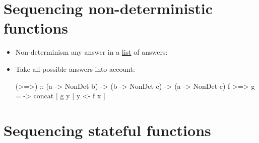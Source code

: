 

\section*{Sequencing non-deterministic functions }

\begin{itemize}
    \item Non-determinism any answer in a \underline{list} of answers:\\
    \item Take all possible answers into account:\\
\begin{codebox}[haskell]
(>=>) :: (a -> NonDet b) -> (b -> NonDet c) -> (a -> NonDet c)
f >=> g = \x -> concat [ g y | y <- f x ]
\end{codebox}
\end{itemize}


\section*{Sequencing stateful functions }

